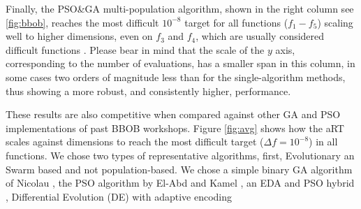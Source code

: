 \documentclass[runningheads]{llncs}
\begin{document}
%
Finally, the PSO\&GA multi-population algorithm, shown in the
right column see \autoref{fig:bbob}, reaches the most difficult $10^{-8}$ target
for all functions ($f_1-f_5$) scaling well to higher dimensions, even
on $f_3$ and $f_4$, which are usually
considered difficult functions \cite{hansen2010bbob}. Please bear
in mind that the scale of the $y$ axis, corresponding to the number of
evaluations, has a smaller span in this column, in some cases two
orders of magnitude less than for the single-algorithm methods, thus
showing a more robust, and consistently higher, performance.


These results are also competitive when compared against other GA and PSO
implementations of past BBOB workshops. Figure \ref{fig:avg} shows
how the aRT scales against dimensions to reach the most difficult target
($\Delta f = 10^{-8}$) in all functions.
We chose two types of representative algorithms, first, Evolutionary 
an Swarm based and  not population-based. We chose a simple binary GA algorithm of Nicolau \cite{nicolau2009application},
the PSO algorithm by El-Abd and Kamel \cite{el2009blackHybrid}, an EDA and PSO
hybrid \cite{el2009blackHybrid}, 
Differential Evolution (DE) with adaptive encoding \cite{povsik2012benchmarking}
\end{document}
